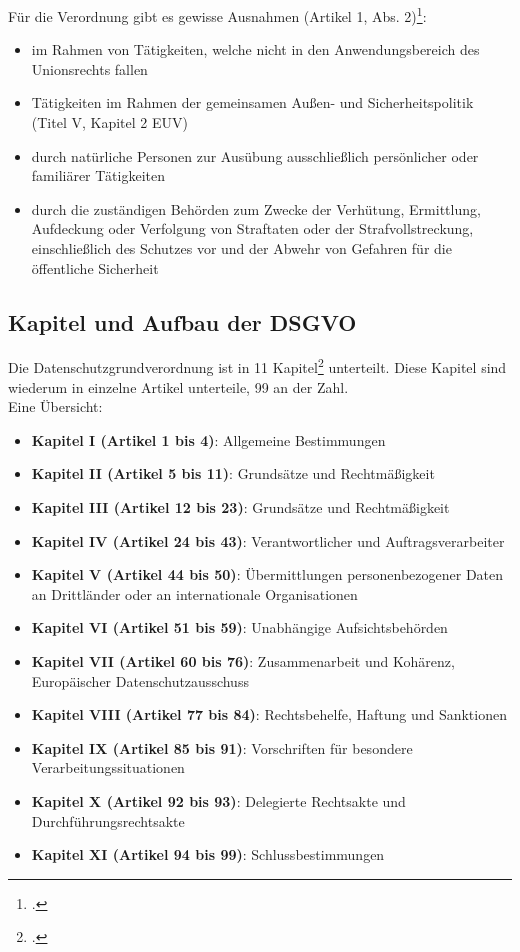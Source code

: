 Für die Verordnung gibt es gewisse Ausnahmen (Artikel 1, Abs. 2)\footcite{Lehrunterlagen-HTL-cloud}:
\begin{itemize}
	\item im Rahmen von Tätigkeiten, welche nicht in den Anwendungsbereich des Unionsrechts fallen
	\item Tätigkeiten im Rahmen der gemeinsamen Außen- und Sicherheitspolitik (Titel V, Kapitel 2 EUV)
	\item durch natürliche Personen zur Ausübung ausschließlich persönlicher oder familiärer Tätigkeiten
	\item durch die zuständigen Behörden zum Zwecke der Verhütung, Ermittlung, Aufdeckung oder Verfolgung von Straftaten oder der Strafvollstreckung, einschließlich des Schutzes vor und der Abwehr von Gefahren für die öffentliche Sicherheit
\end{itemize}

\subsection{Kapitel und Aufbau der DSGVO}
Die Datenschutzgrundverordnung ist in 11 Kapitel\footcite{dsgvo-wiki} unterteilt. Diese Kapitel sind wiederum in einzelne Artikel unterteile, 99 an der Zahl.\\
Eine Übersicht:

\begin{itemize}
	\item \textbf{Kapitel I (Artikel 1 bis 4)}: Allgemeine Bestimmungen
	\item \textbf{Kapitel II (Artikel 5 bis 11)}: Grundsätze und Rechtmäßigkeit
	\item \textbf{Kapitel III (Artikel 12 bis 23)}: Grundsätze und Rechtmäßigkeit
	\item \textbf{Kapitel IV (Artikel 24 bis 43)}: Verantwortlicher und Auftragsverarbeiter
	\item \textbf{Kapitel V (Artikel 44 bis 50)}: Übermittlungen personenbezogener Daten an Drittländer oder an internationale Organisationen
	\item \textbf{Kapitel VI (Artikel 51 bis 59)}: Unabhängige Aufsichtsbehörden
	\item \textbf{Kapitel VII (Artikel 60 bis 76)}: Zusammenarbeit und Kohärenz, Europäischer Datenschutzausschuss
	\item \textbf{Kapitel VIII (Artikel 77 bis 84)}: Rechtsbehelfe, Haftung und Sanktionen
	\item \textbf{Kapitel IX (Artikel 85 bis 91)}: Vorschriften für besondere Verarbeitungssituationen
	\item \textbf{Kapitel X (Artikel 92 bis 93)}: Delegierte Rechtsakte und Durchführungsrechtsakte
	\item \textbf{Kapitel XI (Artikel 94 bis 99)}: Schlussbestimmungen
\end{itemize}

